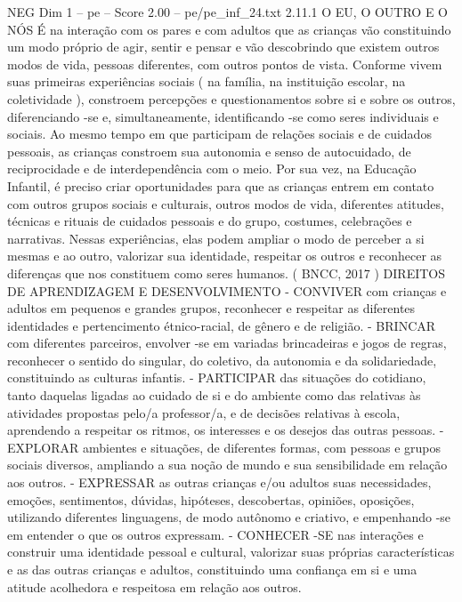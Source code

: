 \begin{textsample}{NEG Dim 1 – pe – Score 2.00 – pe/pe\_inf\_24.txt}  \label{ex:f1_neg_044}
2.11.1 O EU, O OUTRO E O NÓS É na interação com os pares e com adultos que as crianças vão constituindo um modo próprio de agir, sentir e pensar e vão descobrindo que existem outros modos de vida, pessoas diferentes, com outros pontos de vista.
Conforme vivem suas primeiras experiências sociais ( na família, na instituição escolar, na coletividade ), constroem percepções e questionamentos sobre si e sobre os outros, diferenciando -se e, simultaneamente, identificando -se como seres individuais e sociais.
Ao mesmo tempo em que participam de relações sociais e de cuidados pessoais, as crianças constroem sua autonomia e senso de autocuidado, de reciprocidade e de interdependência com o meio.
Por sua vez, na Educação Infantil, é preciso criar oportunidades para que as crianças entrem em contato com outros grupos sociais e culturais, outros modos de vida, diferentes atitudes, técnicas e rituais de cuidados pessoais e do grupo, costumes, celebrações e narrativas.
Nessas experiências, elas podem ampliar o modo de perceber a si mesmas e ao outro, valorizar sua identidade, respeitar os outros e reconhecer as diferenças que nos constituem como seres humanos. ( BNCC, 2017 ) DIREITOS DE APRENDIZAGEM E DESENVOLVIMENTO - CONVIVER com crianças e adultos em pequenos e grandes grupos, reconhecer e respeitar as diferentes identidades e pertencimento étnico-racial, de gênero e de religião. - BRINCAR com diferentes parceiros, envolver -se em variadas brincadeiras e jogos de regras, reconhecer o sentido do singular, do coletivo, da autonomia e da solidariedade, constituindo as culturas infantis. - PARTICIPAR das situações do cotidiano, tanto daquelas ligadas ao cuidado de si e do ambiente como das relativas às atividades propostas pelo/a professor/a, e de decisões relativas à escola, aprendendo a respeitar os ritmos, os interesses e os desejos das outras pessoas. - EXPLORAR ambientes e situações, de diferentes formas, com pessoas e grupos sociais diversos, ampliando a sua noção de mundo e sua sensibilidade em relação aos outros. - EXPRESSAR as outras crianças e/ou adultos suas necessidades, emoções, sentimentos, dúvidas, hipóteses, descobertas, opiniões, oposições, utilizando diferentes linguagens, de modo autônomo e criativo, e empenhando -se em entender o que os outros expressam. - CONHECER -SE nas interações e construir uma identidade pessoal e cultural, valorizar suas próprias características e as das outras crianças e adultos, constituindo uma confiança em si e uma atitude acolhedora e respeitosa em relação aos outros.

\end{textsample}
